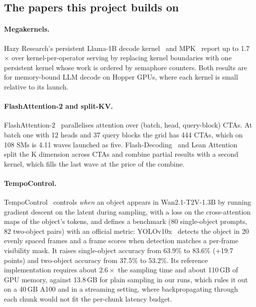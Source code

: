 \documentclass[10pt,a4paper]{article}
\begin{document}
\subsection{The papers this project builds on}
\paragraph{Megakernels.} Hazy Research's persistent Llama-1B decode kernel~\cite{hazy} and MPK~\cite{mpk} report up to 1.7$\times$ over kernel-per-operator serving by replacing kernel boundaries with one persistent kernel whose work is ordered by semaphore counters. Both results are for memory-bound LLM decode on Hopper GPUs, where each kernel is small relative to its launch.

\paragraph{FlashAttention-2 and split-KV.} FlashAttention-2~\cite{fa2} parallelises attention over (batch, head, query-block) CTAs. At batch one with 12 heads and 37 query blocks the grid has 444 CTAs, which on 108 SMs is 4.11 waves launched as five. Flash-Decoding~\cite{flashdecoding} and Lean Attention~\cite{lean} split the K dimension across CTAs and combine partial results with a second kernel, which fills the last wave at the price of the combine.

\paragraph{TempoControl.} TempoControl~\cite{tempocontrol} controls \emph{when} an object appears in Wan2.1-T2V-1.3B by running gradient descent on the latent during sampling, with a loss on the cross-attention maps of the object's tokens, and defines a benchmark (80 single-object prompts, 82 two-object pairs) with an official metric: YOLOv10x~\cite{yolov10} detects the object in 20 evenly spaced frames and a frame scores when detection matches a per-frame visibility mask. It raises single-object accuracy from 63.9\% to 83.6\% (+19.7 points) and two-object accuracy from 37.5\% to 53.2\%. Its reference implementation requires about $2.6\times$ the sampling time and about 110\,GB of GPU memory, against 13.8\,GB for plain sampling in our runs, which rules it out on a 40\,GB A100 and in a streaming setting, where backpropagating through each chunk would not fit the per-chunk latency budget.
\end{document}
